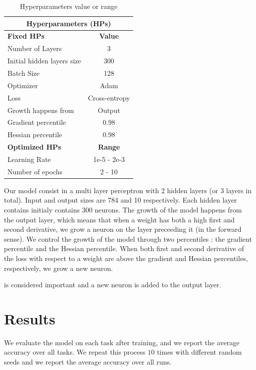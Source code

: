 \documentclass[11pt]{article}
\begin{document}
\begin{table}[h!]
    \centering
    \begin{tabular}{|l|c|}
    \hline
    \multicolumn{2}{|c|}{\textbf{Hyperparameters (HPs)}} \\
    \hline
    \textbf{Fixed HPs} & \textbf{Value}\\
    \hline
    Number of Layers & 3 \\
    Initial hidden layers size & 300 \\
    Batch Size & 128 \\
    Optimizer & Adam \\
    Loss & Cross-entropy \\
    Growth happens from & Output \\
    Gradient percentile & 0.98 \\
    Hessian percentile & 0.98 \\
    \hline
    \hline
    \textbf{Optimized HPs} & \textbf{Range}\\
    \hline
    Learning Rate & 1e-5 - 2e-3 \\
    Number of epochs & 2 - 10 \\
    \hline
    \end{tabular}
    \caption{Hyperparameters value or range}
    \label{table:HPs}
\end{table}

Our model consist in a multi layer perceptron with 2 hidden layers (or 3 layers in total). Input and output sizes are 784 and 10 respectively. Each hidden layer contains initialy contains 300 neurons. The growth of the model happens from the output layer, which means that when a weight has both a high first and second derivative, we grow a neuron on the layer preceeding it (in the forward sense). We control the growth of the model through two percentiles : the gradient percentile and the Hessian percentile. When both first and second derivative of the loss with respect to a weight are above the gradient and Hessian percentiles, respectively, we grow a new neuron. 


is considered important and a new neuron is added to the output layer. 




\section{Results}
We evaluate the model on each task after training, and we report the average accuracy over all tasks. We repeat this process $10$ times with different random seeds and we report the average accuracy over all runs.
\end{document}
